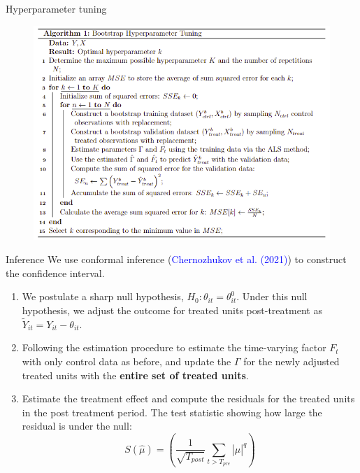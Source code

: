 \documentclass{beamer}
\begin{document}
\begin{frame}{Hyperparameter tuning}
\begin{figure}
    \centering
    \includegraphics[scale=0.8]{figs/boots_tuning.png}
\end{figure}
\end{frame}


\begin{frame}{Inference}
We use conformal inference (\textcolor{blue}{Chernozhukov et al. (2021)}) to construct the confidence interval.

\begin{enumerate}
    \item We postulate a sharp null hypothesis, $H_0: \theta_{it} = \theta_{it}^0$. Under this null hypothesis, we adjust the outcome for treated units post-treatment as $\tilde{Y}_{it} = Y_{it} - \theta_{it}$.
    \item Following the estimation procedure to estimate the time-varying factor $F_t$ with only control data as before, and update the $\Gamma$ for the newly adjusted treated units with the \textbf{entire set of treated units}.
    \item Estimate the treatment effect and compute the residuals for the treated units in the post treatment period. The test statistic showing how large the residual is under the null:
    \begin{equation*}
    S(\hat{\mu}) = \left(\frac{1}{\sqrt{T_{post}}}\sum_{t > T_{pre}} |\hat{\mu}|^q \right)
    \end{equation*}
\end{enumerate}
\end{frame}
\end{document}

